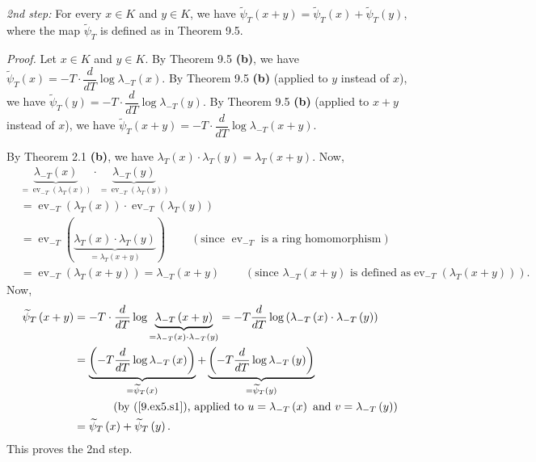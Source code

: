 \documentclass[numbers=enddot,12pt,final,onecolumn,notitlepage]{scrartcl}%
\begin{document}
\textit{2nd step:} For every $x\in K$ and $y\in K$, we have $\widetilde{\psi
}_{T}\left(  x+y\right)  =\widetilde{\psi}_{T}\left(  x\right)
+\widetilde{\psi}_{T}\left(  y\right)  $, where the map $\widetilde{\psi}_{T}$
is defined as in Theorem 9.5.

\textit{Proof.} Let $x\in K$ and $y\in K$. By Theorem 9.5 \textbf{(b)}, we
have $\widetilde{\psi}_{T}\left(  x\right)  =-T\cdot\dfrac{d}{dT}\log
\lambda_{-T}\left(  x\right)  $. By Theorem 9.5 \textbf{(b)} (applied to $y$
instead of $x$), we have $\widetilde{\psi}_{T}\left(  y\right)  =-T\cdot
\dfrac{d}{dT}\log\lambda_{-T}\left(  y\right)  $. By Theorem 9.5 \textbf{(b)}
(applied to $x+y$ instead of $x$), we have $\widetilde{\psi}_{T}\left(
x+y\right)  =-T\cdot\dfrac{d}{dT}\log\lambda_{-T}\left(  x+y\right)  $.

By Theorem 2.1 \textbf{(b)}, we have $\lambda_{T}\left(  x\right)
\cdot\lambda_{T}\left(  y\right)  =\lambda_{T}\left(  x+y\right)  $. Now,%
\begin{align*}
&  \underbrace{\lambda_{-T}\left(  x\right)  }_{=\operatorname*{ev}%
\nolimits_{-T}\left(  \lambda_{T}\left(  x\right)  \right)  }\cdot
\underbrace{\lambda_{-T}\left(  y\right)  }_{=\operatorname*{ev}%
\nolimits_{-T}\left(  \lambda_{T}\left(  y\right)  \right)  }\\
&  =\operatorname*{ev}\nolimits_{-T}\left(  \lambda_{T}\left(  x\right)
\right)  \cdot\operatorname*{ev}\nolimits_{-T}\left(  \lambda_{T}\left(
y\right)  \right) \\
&  =\operatorname*{ev}\nolimits_{-T}\left(  \underbrace{\lambda_{T}\left(
x\right)  \cdot\lambda_{T}\left(  y\right)  }_{=\lambda_{T}\left(  x+y\right)
}\right)  \ \ \ \ \ \ \ \ \ \ \left(  \text{since }\operatorname*{ev}%
\nolimits_{-T}\text{ is a ring homomorphism}\right) \\
&  =\operatorname*{ev}\nolimits_{-T}\left(  \lambda_{T}\left(  x+y\right)
\right)  =\lambda_{-T}\left(  x+y\right)  \ \ \ \ \ \ \ \ \ \ \left(
\text{since }\lambda_{-T}\left(  x+y\right)  \text{ is defined as
}\operatorname*{ev}\nolimits_{-T}\left(  \lambda_{T}\left(  x+y\right)
\right)  \right)  .
\end{align*}
Now,%
\begin{align*}
\widetilde{\psi}_{T}\left(  x+y\right)   &  =-T\cdot\dfrac{d}{dT}%
\log\underbrace{\lambda_{-T}\left(  x+y\right)  }_{=\lambda_{-T}\left(
x\right)  \cdot\lambda_{-T}\left(  y\right)  }=-T\dfrac{d}{dT}\log\left(
\lambda_{-T}\left(  x\right)  \cdot\lambda_{-T}\left(  y\right)  \right) \\
&  =\underbrace{\left(  -T\dfrac{d}{dT}\log\lambda_{-T}\left(  x\right)
\right)  }_{=\widetilde{\psi}_{T}\left(  x\right)  }+\underbrace{\left(
-T\dfrac{d}{dT}\log\lambda_{-T}\left(  y\right)  \right)  }_{=\widetilde{\psi
}_{T}\left(  y\right)  }\\
&  \ \ \ \ \ \ \ \ \ \ \left(  \text{by (\ref{9.ex5.s1}), applied to
}u=\lambda_{-T}\left(  x\right)  \text{ and }v=\lambda_{-T}\left(  y\right)
\right) \\
&  =\widetilde{\psi}_{T}\left(  x\right)  +\widetilde{\psi}_{T}\left(
y\right)  .
\end{align*}
This proves the 2nd step.
\end{document}
